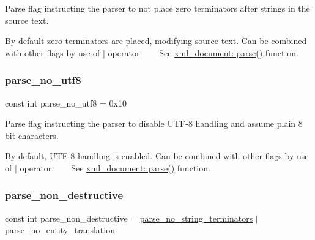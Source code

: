 Parse flag instructing the parser to not place zero terminators after strings in the source text. 

By default zero terminators are placed, modifying source text. Can be combined with other flags by use of $\vert$ operator. ~\newline
~\newline
 See \mbox{\hyperlink{classrapidxml_1_1xml__document_aa280fd704731128b4556b41c1e9182b8}{xml\+\_\+document\+::parse()}} function. \mbox{\label{namespacerapidxml_accde57f6054857ee4042a1b4d98c83b9}} 
\subsubsection{\texorpdfstring{parse\+\_\+no\+\_\+utf8}{parse\_no\_utf8}}
{\footnotesize\ttfamily const int parse\+\_\+no\+\_\+utf8 = 0x10}



Parse flag instructing the parser to disable U\+T\+F-\/8 handling and assume plain 8 bit characters. 

By default, U\+T\+F-\/8 handling is enabled. Can be combined with other flags by use of $\vert$ operator. ~\newline
~\newline
 See \mbox{\hyperlink{classrapidxml_1_1xml__document_aa280fd704731128b4556b41c1e9182b8}{xml\+\_\+document\+::parse()}} function. \mbox{\label{namespacerapidxml_aa97ba1a0a79a6d66f4eef3612508d943}} 
\subsubsection{\texorpdfstring{parse\+\_\+non\+\_\+destructive}{parse\_non\_destructive}}
{\footnotesize\ttfamily const int parse\+\_\+non\+\_\+destructive = \mbox{\hyperlink{namespacerapidxml_a9cae3801e70437cbc410c24bf6be691c}{parse\+\_\+no\+\_\+string\+\_\+terminators}} $\vert$ \mbox{\hyperlink{namespacerapidxml_a7223b7815c4fb8b42e6e4e77e1ea6b97}{parse\+\_\+no\+\_\+entity\+\_\+translation}}}



